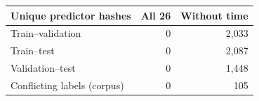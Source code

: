 \begin{tabular}{lrr}
\toprule
Unique predictor hashes & All 26 & Without time \\
\midrule
Train--validation & 0 & 2,033 \\
Train--test & 0 & 2,087 \\
Validation--test & 0 & 1,448 \\
Conflicting labels (corpus) & 0 & 105 \\
\bottomrule
\end{tabular}
